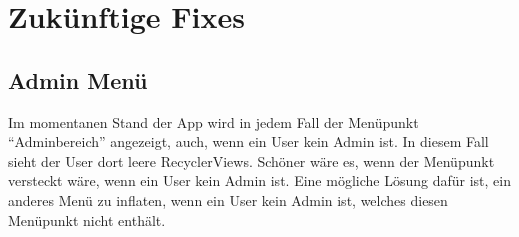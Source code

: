 \chapter{Zukünftige Fixes}

\section{Admin Menü}
Im momentanen Stand der App wird in jedem Fall der Menüpunkt "`Adminbereich"' angezeigt, auch, wenn ein User kein Admin ist. In diesem Fall sieht der User dort leere RecyclerViews. Schöner wäre es, wenn der Menüpunkt versteckt wäre, wenn ein User kein Admin ist. Eine mögliche Lösung dafür ist, ein anderes Menü zu inflaten, wenn ein User kein Admin ist, welches diesen Menüpunkt nicht enthält.